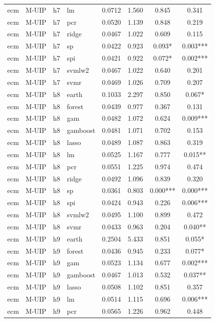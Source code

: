 \begin{ThreePartTable}
\begin{longtable}[t]{llclcccc}
ecm & M-UIP & h7 & lm & 0.0712 & 1.560 & 0.845 & 0.341\\
ecm & M-UIP & h7 & pcr & 0.0520 & 1.139 & 0.848 & 0.219\\
ecm & M-UIP & h7 & ridge & 0.0467 & 1.022 & 0.609 & 0.115\\
ecm & M-UIP & h7 & sp & 0.0422 & 0.923 & 0.093* & 0.003***\\
ecm & M-UIP & h7 & spi & 0.0421 & 0.922 & 0.072* & 0.002***\\
ecm & M-UIP & h7 & svmlw2 & 0.0467 & 1.022 & 0.640 & 0.201\\
ecm & M-UIP & h7 & svmr & 0.0469 & 1.026 & 0.709 & 0.207\\
\addlinespace
ecm & M-UIP & h8 & earth & 0.1033 & 2.297 & 0.850 & 0.067*\\
ecm & M-UIP & h8 & forest & 0.0439 & 0.977 & 0.367 & 0.131\\
ecm & M-UIP & h8 & gam & 0.0482 & 1.072 & 0.624 & 0.009***\\
ecm & M-UIP & h8 & gamboost & 0.0481 & 1.071 & 0.702 & 0.153\\
ecm & M-UIP & h8 & lasso & 0.0489 & 1.087 & 0.863 & 0.319\\
ecm & M-UIP & h8 & lm & 0.0525 & 1.167 & 0.777 & 0.015**\\
ecm & M-UIP & h8 & pcr & 0.0551 & 1.225 & 0.974 & 0.474\\
ecm & M-UIP & h8 & ridge & 0.0492 & 1.096 & 0.839 & 0.320\\
ecm & M-UIP & h8 & sp & 0.0361 & 0.803 & 0.000*** & 0.000***\\
ecm & M-UIP & h8 & spi & 0.0424 & 0.943 & 0.226 & 0.006***\\
ecm & M-UIP & h8 & svmlw2 & 0.0495 & 1.100 & 0.899 & 0.472\\
ecm & M-UIP & h8 & svmr & 0.0433 & 0.963 & 0.204 & 0.040**\\
\addlinespace
ecm & M-UIP & h9 & earth & 0.2504 & 5.433 & 0.851 & 0.055*\\
ecm & M-UIP & h9 & forest & 0.0436 & 0.945 & 0.233 & 0.077*\\
ecm & M-UIP & h9 & gam & 0.0523 & 1.134 & 0.677 & 0.002***\\
ecm & M-UIP & h9 & gamboost & 0.0467 & 1.013 & 0.532 & 0.037**\\
ecm & M-UIP & h9 & lasso & 0.0508 & 1.102 & 0.851 & 0.357\\
ecm & M-UIP & h9 & lm & 0.0514 & 1.115 & 0.696 & 0.006***\\
ecm & M-UIP & h9 & pcr & 0.0565 & 1.226 & 0.962 & 0.448\\

\end{longtable}
\end{ThreePartTable}
